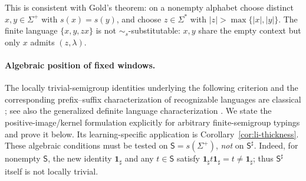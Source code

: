 \documentclass[11pt,a4paper]{article}
\theoremstyle{remark}
\theoremstyle{plain}
\begin{document}
This is consistent with Gold's theorem: on a nonempty alphabet choose
distinct $x,y\in\Sigma^+$ with $s(x)=s(y)$, and choose
$z\in\Sigma^*$ with $|z|>\max\{|x|,|y|\}$.  The finite language $\{x,y,zx\}$
is not $\sim_s$-substitutable: $x,y$ share the empty context
but only $x$ admits $(z,\lambda)$.

\paragraph{Algebraic position of fixed windows.}
The locally trivial-semigroup identities underlying the
following criterion and the corresponding prefix--suffix
characterization of recognizable languages are classical
\cite[Chapter~2, Proposition~3.5 and Theorem~3.6]{pin1986};
see also the generalized definite language characterization
\cite[Proposition~5.18]{pin1997}.
We state the positive-image/kernel formulation explicitly for
arbitrary finite-semigroup typings and prove it below.
Its learning-specific application is Corollary~\ref{cor:li-thickness}.
These algebraic conditions must be tested on
$\mathsf S=s(\Sigma^+)$, \emph{not} on $\mathsf S^\sharp$.
Indeed, for nonempty $\mathsf S$, the new identity
$\mathbf{1}_{\sharp}$ and any $t\in \mathsf S$ satisfy
$\mathbf{1}_{\sharp} t\mathbf{1}_{\sharp}=t\ne\mathbf{1}_{\sharp}$;
thus $\mathsf S^\sharp$ itself is not locally trivial.
\end{document}
